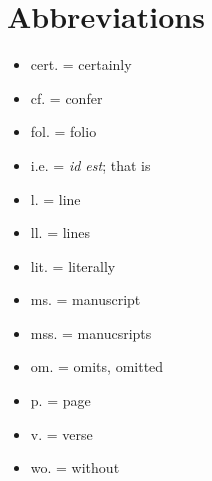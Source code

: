\section{Abbreviations}
  \begin{itemize}
    \item cert. = certainly
    \item cf. = confer
    \item fol. = folio
    \item i.e. = \emph{id est}; that is
    \item l. = line
    \item ll. = lines
    \item lit. = literally
    \item ms. = manuscript
    \item mss. = manucsripts
    \item om. = omits, omitted
    \item p. = page
    \item v. = verse
    \item wo. = without\end{itemize}
